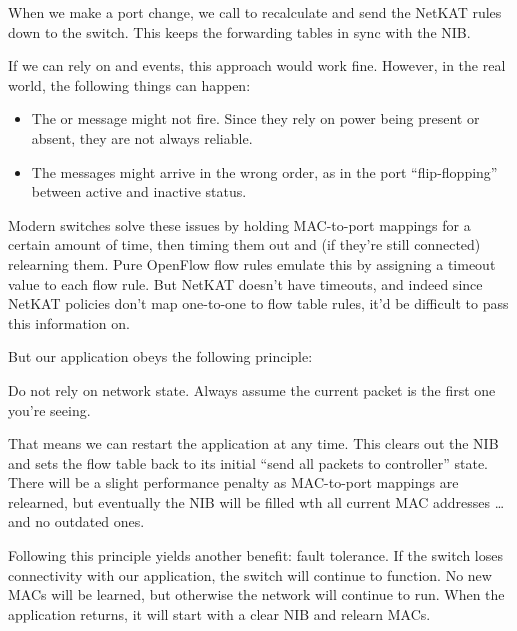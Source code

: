 \inputminted[firstline=65,lastline=74]{python}{code/l2_learning_switch/learning4.py}

When we make a port change, we call  to recalculate and send the NetKAT rules down to the 
switch.  This keeps the forwarding tables in sync with the NIB.  

If we can rely on  and  events, this approach would work fine.
However, in the real world, the following things can happen:

\begin{itemize}
\item The  or  message might not fire.  Since they rely on power being
present or absent, they are not always reliable.
\item The messages might arrive in the wrong order, as in the port ``flip-flopping'' between active and 
inactive status.
\end{itemize}

Modern switches solve these issues by holding MAC-to-port mappings for a certain amount of time, then 
timing them out and (if they're still connected) relearning them.  Pure OpenFlow flow rules emulate
this by assigning a timeout value to each flow rule.   But NetKAT doesn't have timeouts, and indeed since
NetKAT policies don't map one-to-one to flow table rules, it'd be difficult to pass this information on.

But our application obeys the following principle:

\setcounter{principle}{4}

\begin{principle}
Do not rely on network state.  Always assume the current packet is the first one you're seeing.   
\end{principle}
 
That means we can restart the application at any time.  This clears out the NIB and sets the flow table
back to its initial ``send all packets to controller'' state.  
There will be a slight performance penalty as MAC-to-port mappings are relearned, but eventually the
NIB will be filled wth all current MAC addresses \ldots and no outdated ones.

Following this principle yields another benefit: fault tolerance.  If the switch loses connectivity with 
our application, the switch will continue to function.  No new MACs will be learned, but otherwise the 
network will continue to run.  When the application returns, it will start with a clear NIB and relearn MACs.  

